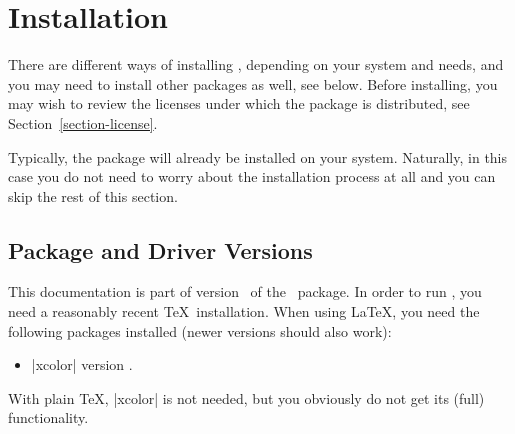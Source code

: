 %
%
%


\section{Installation}

There are different ways of installing \pgfname, depending on your system and
needs, and you may need to install other packages as well, see below. Before
installing, you may wish to review the licenses under which the package is
distributed, see Section~\ref{section-license}.

Typically, the package will already be installed on your system. Naturally, in
this case you do not need to worry about the installation process at all and
you can skip the rest of this section.


\subsection{Package and Driver Versions}

This documentation is part of version \pgfversion\ of the \pgfname\ package. In
order to run \pgfname, you need a reasonably recent \TeX\ installation. When
using \LaTeX, you need the following packages installed (newer versions should
also work):
%
\begin{itemize}
    \item |xcolor| version \xcolorversion.
\end{itemize}
%
With plain \TeX, |xcolor| is not needed, but you obviously do not get its
(full) functionality.

